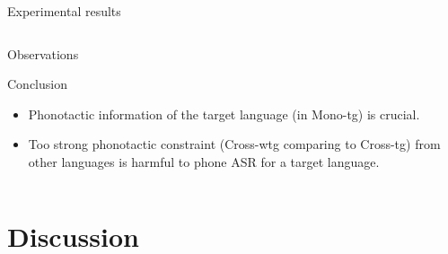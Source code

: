 \documentclass{beamer}
\begin{document}
\begin{frame}{Experimental results}
\begin{columns}
\begin{footnotesize}
\begin{block}{Observations}
\end{block}
\begin{block}{Conclusion}
    \begin{itemize}
        \item Phonotactic information of the target language (in Mono-tg) is crucial.
        \item Too strong phonotactic constraint (Cross-wtg comparing to Cross-tg) from other languages is harmful to phone ASR for a target language.
    \end{itemize}
\end{block}
\end{footnotesize}

    \end{columns}
\end{frame}


\section{Discussion}
\end{document}
